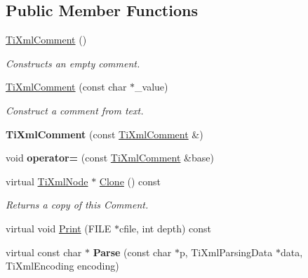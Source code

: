 \subsection*{Public Member Functions}
\begin{DoxyCompactItemize}
\item 
\hypertarget{class_ti_xml_comment_aaa3252031d3e8bd3a2bf51a1c61201b7}{
\hyperlink{class_ti_xml_comment_aaa3252031d3e8bd3a2bf51a1c61201b7}{TiXmlComment} ()}
\label{class_ti_xml_comment_aaa3252031d3e8bd3a2bf51a1c61201b7}

\begin{DoxyCompactList}\small\item\em Constructs an empty comment. \item\end{DoxyCompactList}\item 
\hypertarget{class_ti_xml_comment_a37e7802ef17bc03ebe5ae79bf0713d47}{
\hyperlink{class_ti_xml_comment_a37e7802ef17bc03ebe5ae79bf0713d47}{TiXmlComment} (const char $\ast$\_\-value)}
\label{class_ti_xml_comment_a37e7802ef17bc03ebe5ae79bf0713d47}

\begin{DoxyCompactList}\small\item\em Construct a comment from text. \item\end{DoxyCompactList}\item 
\hypertarget{class_ti_xml_comment_afaec41ac2760ce946ba1590eb5708e50}{
{\bfseries TiXmlComment} (const \hyperlink{class_ti_xml_comment}{TiXmlComment} \&)}
\label{class_ti_xml_comment_afaec41ac2760ce946ba1590eb5708e50}

\item 
\hypertarget{class_ti_xml_comment_a46373f99b65cb960637dccb1f126bd49}{
void {\bfseries operator=} (const \hyperlink{class_ti_xml_comment}{TiXmlComment} \&base)}
\label{class_ti_xml_comment_a46373f99b65cb960637dccb1f126bd49}

\item 
\hypertarget{class_ti_xml_comment_a0d6662bdc52488b9e12b3c7a0453d028}{
virtual \hyperlink{class_ti_xml_node}{TiXmlNode} $\ast$ \hyperlink{class_ti_xml_comment_a0d6662bdc52488b9e12b3c7a0453d028}{Clone} () const }
\label{class_ti_xml_comment_a0d6662bdc52488b9e12b3c7a0453d028}

\begin{DoxyCompactList}\small\item\em Returns a copy of this Comment. \item\end{DoxyCompactList}\item 
virtual void \hyperlink{class_ti_xml_comment_a6b316527aaa8da0370cd68c22a5a0f5f}{Print} (FILE $\ast$cfile, int depth) const 
\item 
\hypertarget{class_ti_xml_comment_a11f1ee9d37a49c06f297c827d0f4e790}{
virtual const char $\ast$ {\bfseries Parse} (const char $\ast$p, TiXmlParsingData $\ast$data, TiXmlEncoding encoding)}
\label{class_ti_xml_comment_a11f1ee9d37a49c06f297c827d0f4e790}


\end{DoxyCompactItemize}
